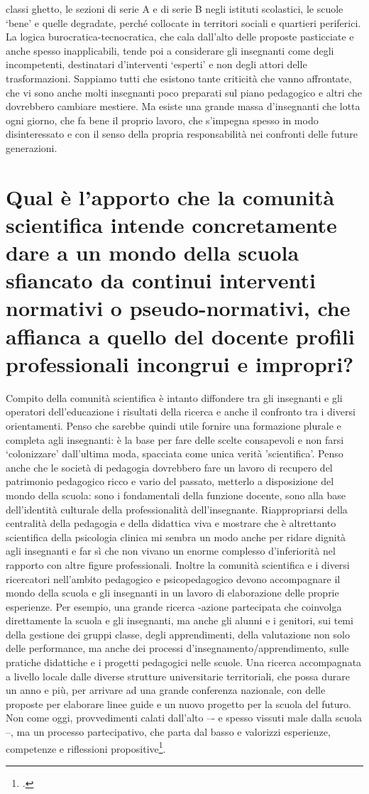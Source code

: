 classi ghetto, le sezioni di serie A e di serie B negli istituti scolastici, le scuole ‘bene’ e quelle degradate, perché collocate in territori sociali e quartieri periferici. La logica burocratica-tecnocratica, che cala dall'alto delle proposte pasticciate e anche spesso inapplicabili, tende poi a considerare gli insegnanti come degli incompetenti, destinatari d'interventi ‘esperti’ e non degli attori delle trasformazioni. Sappiamo tutti che esistono tante criticità che vanno affrontate, che vi sono anche molti insegnanti poco preparati sul piano pedagogico e altri che dovrebbero cambiare mestiere. Ma esiste una grande massa d'insegnanti che lotta ogni giorno, che fa bene il proprio lavoro, che s'impegna spesso in modo disinteressato e con il senso della propria responsabilità nei confronti delle future generazioni.
\section*{Qual è l'apporto che la comunità scientifica intende concretamente dare a un mondo della scuola sfiancato da continui interventi normativi o pseudo-normativi, che affianca a quello del docente profili professionali incongrui e impropri?}
Compito della comunità scientifica è intanto diffondere tra gli insegnanti e gli operatori dell'educazione i risultati della ricerca e anche il confronto tra i diversi orientamenti. Penso che sarebbe quindi utile fornire una formazione plurale e completa agli insegnanti: è la base per fare delle scelte consapevoli e non farsi ‘colonizzare’ dall'ultima moda, spacciata come unica verità ’scientifica’. Penso anche che le società di pedagogia dovrebbero fare un lavoro di recupero del patrimonio pedagogico ricco e vario del passato, metterlo a disposizione del mondo della scuola: sono i fondamentali della funzione docente, sono alla base dell'identità culturale della professionalità dell'insegnante. Riappropriarsi della centralità della pedagogia e della didattica viva e mostrare che è altrettanto scientifica della psicologia clinica mi sembra un modo anche per ridare dignità agli insegnanti e far sì che non vivano un enorme complesso d'inferiorità nel rapporto con altre figure professionali. Inoltre la comunità scientifica e i diversi ricercatori nell'ambito pedagogico e psicopedagogico devono accompagnare il mondo della scuola e gli insegnanti in un lavoro di elaborazione delle proprie esperienze. Per esempio, una grande ricerca -azione partecipata che coinvolga direttamente la scuola e gli insegnanti, ma anche gli alunni e i genitori, sui temi della gestione dei gruppi classe, degli apprendimenti, della valutazione non solo delle performance, ma anche dei processi d'insegnamento/apprendimento, sulle pratiche didattiche e i progetti pedagogici nelle scuole. Una ricerca accompagnata a livello locale dalle diverse strutture universitarie territoriali, che possa durare un anno e più, per arrivare ad una grande conferenza nazionale, con delle proposte per elaborare linee guide e un nuovo progetto per la scuola del futuro. Non come oggi, provvedimenti calati dall'alto –- e spesso vissuti male dalla scuola --, ma un processo partecipativo, che parta dal basso e valorizzi esperienze, competenze e riflessioni propositive\footcite{Boscaino2013}.
